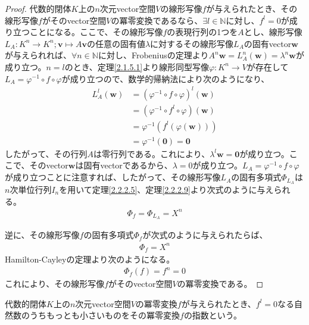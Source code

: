 \documentclass[dvipdfmx]{jsarticle}
\begin{document}
\begin{proof}
代数的閉体$K$上の$n$次元vector空間$V$の線形写像$f$が与えられたとき、その線形写像$f$がそのvector空間$V$の冪零変換であるなら、$\exists l \in \mathbb{N}$に対し、$f^{l} = 0$が成り立つことになる。ここで、その線形写像$f$の表現行列の1つを$A$とし、線形写像$L_{A}:K^{n} \rightarrow K^{n};\mathbf{v} \mapsto A\mathbf{v}$の任意の固有値$\lambda$に対するその線形写像$L_{A}$の固有vector$\mathbf{w}$が与えられれば、$\forall n \in \mathbb{N}$に対し、Frobeniusの定理より$A^{n}\mathbf{w} = L_{A}^{n}\left( \mathbf{w} \right) = \lambda^{n}\mathbf{w}$が成り立つ。$n = l$のとき、定理\ref{2.1.5.1}より線形同型写像$\varphi:K^{n} \rightarrow V$が存在して$L_{A} = \varphi^{- 1} \circ f \circ \varphi$が成り立つので、数学的帰納法により次のようになり、
\begin{align*}
L_{A}^{l}\left( \mathbf{w} \right) &= \left( \varphi^{- 1} \circ f \circ \varphi \right)^{l}\left( \mathbf{w} \right)\\
&= \left( \varphi^{- 1} \circ f^{l} \circ \varphi \right)\left( \mathbf{w} \right)\\
&= \varphi^{- 1}\left( f^{l}\left( \varphi\left( \mathbf{w} \right) \right) \right)\\
&= \varphi^{- 1}\left( \mathbf{0} \right) = \mathbf{0}
\end{align*}
したがって、その行列$A$は零行列である。これにより、$\lambda^{l}\mathbf{w} = \mathbf{0}$が成り立つ。ここで、そのvector$\mathbf{w}$は固有vectorであるから、$\lambda = 0$が成り立つ。$L_{A} = \varphi^{- 1} \circ f \circ \varphi$が成り立つことに注意すれば、したがって、その線形写像$L_{A}$の固有多項式$\varPhi_{L_{A}}$は$n$次単位行列$I_{n}$を用いて定理\ref{2.2.2.5}、定理\ref{2.2.2.9}より次式のように与えられる。
\begin{align*}
\varPhi_{f} = \varPhi_{L_{A}} = X^{n}
\end{align*}\par
逆に、その線形写像$f$の固有多項式$\varPhi_{f}$が次式のように与えられたらば、
\begin{align*}
\varPhi_{f} = X^{n}
\end{align*}
Hamilton-Cayleyの定理より次のようになる。
\begin{align*}
\varPhi_{f}(f) = f^{n} = 0
\end{align*}
これにより、その線形写像$f$がそのvector空間$V$の冪零変換である。
\end{proof}
\begin{dfn}
代数的閉体$K$上の$n$次元vector空間$V$の冪零変換$f$が与えられたとき、$f^{l} = 0$なる自然数のうちもっとも小さいものをその冪零変換$f$の指数という。
\end{dfn}
\end{document}
